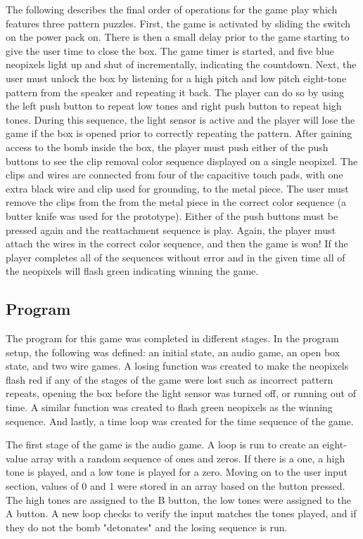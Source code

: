 \documentclass[12pt]{article}
\begin{document}
The following describes the final order of operations for the game play which features three pattern puzzles. First, the game is activated by sliding the switch on the power pack on.  There is then a small delay prior to the game starting to give the user time to close the box.  The game timer is started, and five blue neopixels light up and shut of incrementally, indicating the countdown.  Next, the user must unlock the box by listening for a high pitch and low pitch eight-tone pattern from the speaker and repeating it back.  The player can do so by using the left push button to repeat low tones and right push button to repeat high tones. During this sequence, the light sensor is active and the player will lose the game if the box is opened prior to correctly repeating the pattern.  After gaining access to the bomb inside the box, the player must push either of the push buttons to see the clip removal color sequence displayed on a single neopixel.  The clips and wires are connected from four of the capacitive touch pads, with one extra black wire and clip used for grounding, to the metal piece. The user must remove the clips from the from the metal piece in the correct color sequence (a butter knife was used for the prototype).  Either of the push buttons must be pressed again and the reattachment sequence is play.  Again, the player must attach the wires in the correct color sequence, and then the game is won! If the player completes all of the sequences without error and in the given time all of the neopixels will flash green indicating winning the game. 

\subsection{Program}
The program for this game was completed in different stages.  In the program setup, the following was defined: an initial state, an audio game, an open box state, and two wire games. A losing function was created to make the neopixels flash red if any of the stages of the game were lost such as incorrect pattern repeats, opening the box before the light sensor was turned off, or running out of time.  A similar function was created to flash green neopixels as the winning sequence. And lastly, a time loop was created for the time sequence of the game. 

The first stage of the game is the audio game. A loop is run to create an eight-value array with a random sequence of ones and zeros. If there is a one, a high tone is played, and a low tone is played for a zero. Moving on to the user input section, values of 0 and 1 were stored in an array based on the button pressed. The high tones are assigned to the B button, the low tones were assigned to the A button. A new loop checks to verify the input matches the tones played, and if they do not the bomb "detonates" and the losing sequence is run. 
\end{document}
